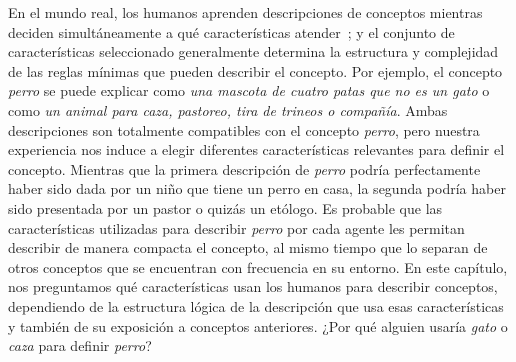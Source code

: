 En el mundo real, los humanos aprenden descripciones de conceptos mientras deciden simultáneamente a qué características atender~\cite{schyns1998development}; y el conjunto de características seleccionado generalmente determina la estructura y complejidad de las reglas mínimas que pueden describir el concepto. Por ejemplo, el concepto \textit{perro} se puede explicar como {\em una mascota de cuatro patas que no es un gato} o como {\em un animal para caza, pastoreo, tira de trineos o compañía}. Ambas descripciones son totalmente compatibles con el concepto \textit{perro}, pero nuestra experiencia nos induce a elegir diferentes características relevantes para definir el concepto. Mientras que la primera descripción de {\em perro} podría perfectamente haber sido dada por un niño que tiene un perro en casa, la segunda podría haber sido presentada por un pastor o quizás un etólogo. Es probable que las características utilizadas para describir {\em perro} por cada agente les permitan describir de manera compacta el concepto, al mismo tiempo que lo separan de otros conceptos que se encuentran con frecuencia en su entorno. En este capítulo, nos preguntamos qué características usan los humanos para describir conceptos, dependiendo de la estructura lógica de la descripción que usa esas características y también de su exposición a conceptos anteriores. ¿Por qué alguien usaría {\em gato} o {\em caza} para definir {\em perro}?
